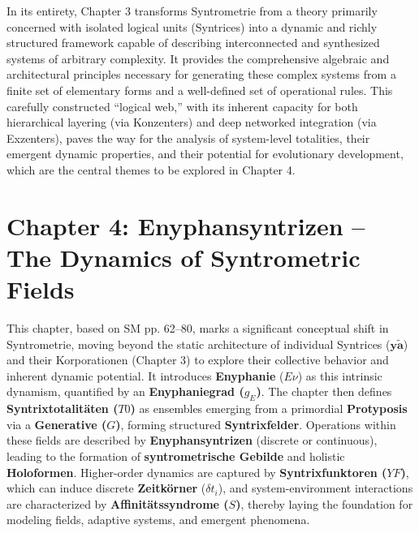 \documentclass[12pt]{article}
\newcommand{\q}[1]{\enquote{#1}}
\newcommand{\syntrix}{\bm{y\widetilde{a}}}
\newcommand{\enyphaniegrad}{g_E}
\newcommand{\syntrixtotalitaet}{T0}
\newcommand{\generative}{G}
\newcommand{\syntrixfunktor}{YF}
\newcommand{\zeitkorn}{\delta t_i}
\newcommand{\affinitaetssyndrom}{S}
\begin{document}
In its entirety, Chapter 3 transforms Syntrometrie from a theory primarily concerned with isolated logical units (Syntrices) into a dynamic and richly structured framework capable of describing interconnected and synthesized systems of arbitrary complexity. It provides the comprehensive algebraic and architectural principles necessary for generating these complex systems from a finite set of elementary forms and a well-defined set of operational rules. This carefully constructed \q{logical web,} with its inherent capacity for both hierarchical layering (via Konzenters) and deep networked integration (via Exzenters), paves the way for the analysis of system-level totalities, their emergent dynamic properties, and their potential for evolutionary development, which are the central themes to be explored in Chapter 4.

\clearpage

\section{Chapter 4: Enyphansyntrizen – The Dynamics of Syntrometric Fields}
\label{sec:chapter4}

This chapter, based on SM pp. 62–80, marks a significant conceptual shift in Syntrometrie, moving beyond the static architecture of individual Syntrices (\(\syntrix\)) and their Korporationen (Chapter 3) to explore their collective behavior and inherent dynamic potential. It introduces \textbf{Enyphanie} (\(E\nu\)) as this intrinsic dynamism, quantified by an \textbf{Enyphaniegrad (\(\enyphaniegrad\))}. The chapter then defines \textbf{Syntrixtotalitäten (\(\syntrixtotalitaet\))} as ensembles emerging from a primordial \textbf{Protyposis} via a \textbf{Generative (\(\generative\))}, forming structured \textbf{Syntrixfelder}. Operations within these fields are described by \textbf{Enyphansyntrizen} (discrete or continuous), leading to the formation of \textbf{syntrometrische Gebilde} and holistic \textbf{Holoformen}. Higher-order dynamics are captured by \textbf{Syntrixfunktoren (\(\syntrixfunktor\))}, which can induce discrete \textbf{Zeitkörner} (\(\zeitkorn\)), and system-environment interactions are characterized by \textbf{Affinitätssyndrome (\(\affinitaetssyndrom\))}, thereby laying the foundation for modeling fields, adaptive systems, and emergent phenomena.
\end{document}
